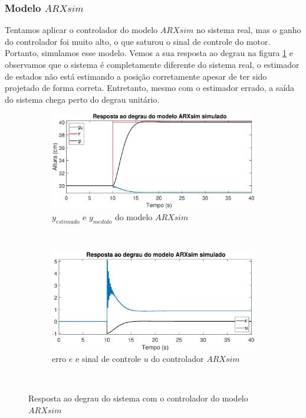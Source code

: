 \subsubsection{Modelo $ARXsim$}

Tentamos aplicar o controlador do modelo $ARXsim$ no sistema real, mas o ganho do controlador foi muito alto, o que saturou o sinal de controle do motor. Portanto, simulamos esse modelo. Vemos a sua resposta ao degrau na figura \ref{fig:stepsarxsimy} e observamos que o sistema é completamente diferente do sistema real, o estimador de estados não está estimando a posição corretamente apesar de ter sido projetado de forma correta. Entretanto, mesmo com o estimador errado, a saída do sistema chega perto do degrau unitário.

\begin{figure}[htb]
	\centering
	\begin{subfigure}[t]{0.48\textwidth}
		\includegraphics[width=1\linewidth]{pasta1_figuras/stepsarxsimy}
		\caption[$y_{estimado}$ e $y_{medido}$ do modelo $ARX2$]{$y_{estimado}$ e $y_{medido}$ do modelo $ARXsim$}
		\label{fig:stepsarxsimy}
	\end{subfigure}
	~ %
	\begin{subfigure}[t]{0.48\textwidth}
		\includegraphics[width=1\linewidth]{pasta1_figuras/stepsarxsime}
		\caption[erro $e$ e sinal de controle $u$ do controlador $ARX2$]{erro $e$ e sinal de controle $u$ do controlador $ARXsim$}
		\label{fig:stepsarxsime}
	\end{subfigure}
	~ %
	
	\caption{Resposta ao degrau do sistema com o controlador do modelo $ARXsim$}\label{fig:stepsarxsim}
\end{figure}

